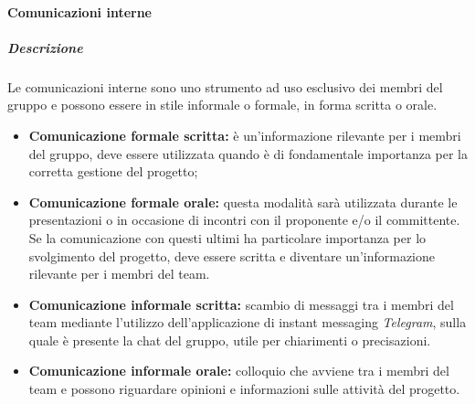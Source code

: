 			\paragraph{Comunicazioni interne}
			\subparagraph{Descrizione}
			Le comunicazioni interne sono uno strumento ad uso esclusivo dei membri del gruppo e possono essere in stile informale o formale, in forma scritta o orale. 
				\begin{itemize}
					\item \textbf{Comunicazione formale scritta:} è un'informazione rilevante per i membri del gruppo, deve essere utilizzata quando è di fondamentale importanza per la corretta gestione del progetto;
					\item \textbf{Comunicazione formale orale:} questa modalità sarà utilizzata durante le presentazioni o in occasione di incontri con il proponente e/o il committente. Se la comunicazione con questi ultimi ha particolare importanza per lo svolgimento del progetto, deve essere scritta e diventare un'informazione rilevante per i membri del team.
					\item \textbf{Comunicazione informale scritta:} scambio di messaggi tra i membri del team mediante l'utilizzo dell'applicazione di instant messaging \textit{Telegram}, sulla quale è presente la chat del gruppo, utile per chiarimenti o precisazioni.
					\item \textbf{Comunicazione informale orale:} colloquio che avviene tra i membri del team e possono riguardare opinioni e informazioni sulle attività del progetto. 
				\end{itemize}

